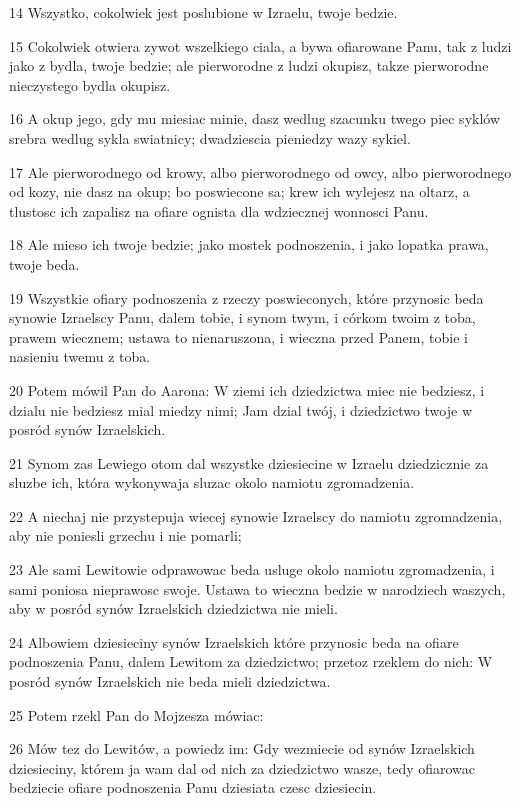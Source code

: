 \par 14 Wszystko, cokolwiek jest poslubione w Izraelu, twoje bedzie.
\par 15 Cokolwiek otwiera zywot wszelkiego ciala, a bywa ofiarowane Panu, tak z ludzi jako z bydla, twoje bedzie; ale pierworodne z ludzi okupisz, takze pierworodne nieczystego bydla okupisz.
\par 16 A okup jego, gdy mu miesiac minie, dasz wedlug szacunku twego piec syklów srebra wedlug sykla swiatnicy; dwadziescia pieniedzy wazy sykiel.
\par 17 Ale pierworodnego od krowy, albo pierworodnego od owcy, albo pierworodnego od kozy, nie dasz na okup; bo poswiecone sa; krew ich wylejesz na oltarz, a tlustosc ich zapalisz na ofiare ognista dla wdziecznej wonnosci Panu.
\par 18 Ale mieso ich twoje bedzie; jako mostek podnoszenia, i jako lopatka prawa, twoje beda.
\par 19 Wszystkie ofiary podnoszenia z rzeczy poswieconych, które przynosic beda synowie Izraelscy Panu, dalem tobie, i synom twym, i córkom twoim z toba, prawem wiecznem; ustawa to nienaruszona, i wieczna przed Panem, tobie i nasieniu twemu z toba.
\par 20 Potem mówil Pan do Aarona: W ziemi ich dziedzictwa miec nie bedziesz, i dzialu nie bedziesz mial miedzy nimi; Jam dzial twój, i dziedzictwo twoje w posród synów Izraelskich.
\par 21 Synom zas Lewiego otom dal wszystke dziesiecine w Izraelu dziedzicznie za sluzbe ich, która wykonywaja sluzac okolo namiotu zgromadzenia.
\par 22 A niechaj nie przystepuja wiecej synowie Izraelscy do namiotu zgromadzenia, aby nie poniesli grzechu i nie pomarli;
\par 23 Ale sami Lewitowie odprawowac beda usluge okolo namiotu zgromadzenia, i sami poniosa nieprawosc swoje. Ustawa to wieczna bedzie w narodziech waszych, aby w posród synów Izraelskich dziedzictwa nie mieli.
\par 24 Albowiem dziesieciny synów Izraelskich które przynosic beda na ofiare podnoszenia Panu, dalem Lewitom za dziedzictwo; przetoz rzeklem do nich: W posród synów Izraelskich nie beda mieli dziedzictwa.
\par 25 Potem rzekl Pan do Mojzesza mówiac:
\par 26 Mów tez do Lewitów, a powiedz im: Gdy wezmiecie od synów Izraelskich dziesieciny, którem ja wam dal od nich za dziedzictwo wasze, tedy ofiarowac bedziecie ofiare podnoszenia Panu dziesiata czesc dziesiecin.
